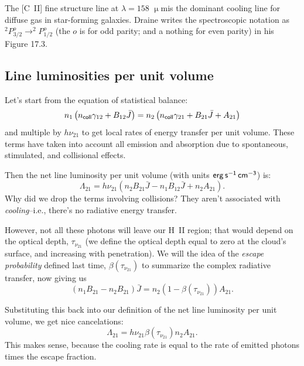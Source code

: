 \documentclass{tufte-handout}
\renewcommand{\rm}{\sf}
\newcommand{\HII}{\textnormal{H{\smaller~\textsc{II}}}}
\renewcommand{\smallcaps}[1]{{\smaller~\textsc{#1}}}
\newcommand{\spec}[2]{\textnormal{#1}\smallcaps{#2}} %
\newcommand{\m}{\upmu} %
\newcommand{\um}{$\m{}$m}
\begin{document}
The [\spec{C}{II}] fine structure line at $\lambda = 158$ \um is the dominant cooling line for diffuse gas in star-forming galaxies. Draine writes the spectroscopic notation as $^2P_{3/2}^o \rightarrow ^2 P_{1/2}^o$ (the $o$ is for odd parity; and a nothing for even parity) in his Figure 17.3.

\subsection{Line luminosities per unit volume}
Let's start from the equation of statistical balance:
\[n_1\left ( n_{\rm coll}\gamma_{12} + B_{12}\bar J \right ) = n_2 \left (n_{\rm coll}\gamma _{21} + B_{21}\bar J + A_{21}\right )   \]
and multiple by $h \nu_{21}$ to get local rates of energy transfer per unit volume. These terms have taken into account all emission and absorption due to spontaneous, stimulated, and collisional effects.

Then the net line luminosity per unit volume (with units ${\rm erg\, s^{-1}\, cm^{-3}}$) is:
\begin{equation}
\Lambda_{21} = h\nu_{21}\left (n_2B_{21}\bar J - n_1 B_{12} \bar J + n_2 A_{21}\right ).
\end{equation}
Why did we drop the terms involving collisions? They aren't associated with \textit{cooling}--i.e., there's no radiative energy transfer.

However, not all these photons will leave our \HII{} region; that would depend on the optical depth, $\tau_{\nu_{21}}$ (we define the optical depth equal to zero at the cloud's surface, and increasing with penetration). We will the idea of the \textit{escape probability} defined last time, $\beta(\tau_{\nu_{21}})$ to summarize the complex radiative transfer, now giving us
\begin{equation}
\left (n_1 B_{21} - n_2{B_{21}}\right )\bar J = n_2\left (1 - \beta(\tau_{\nu_{21}})\right )A_{21}.
\end{equation}

Substituting this back into our definition of the net line luminosity per unit volume, we get nice cancelations:
\begin{equation}\label{eq:cooling rate}
\Lambda_{21} = h \nu_{21} \beta(\tau_{\nu_{21}}) n_2 A_{21}.
\end{equation}
This makes sense, because the cooling rate is equal to the rate of emitted photons times the escape fraction.
\end{document}
